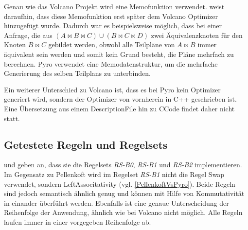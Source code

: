 Genau wie das Volcano Projekt wird eine Memofunktion verwendet. \cite{roy2001multi} weist daraufhin, dass diese Memofunktion erst später dem Volcano Optimizer hinzugefügt wurde. Dadurch war es beispielsweise möglich, dass bei einer Anfrage, die aus $(A \Join B \Join C) \cup (B \Join C \Join D)$ zwei Äquivalenzknoten für den Knoten $B \Join C$ gebildet werden, obwohl alle Teilpläne von $A \Join B$ immer äquivalent sein werden und somit kein Grund besteht, die Pläne mehrfach zu berechnen. Pyro verwendet eine Memodatenstruktur, um die mehrfache Generierung des selben Teilplans zu unterbinden.

Ein weiterer Unterschied zu Volcano ist, dass es  bei Pyro kein Optimizer generiert wird, sondern der Optimizer von vornherein in C++ geschrieben ist. Eine Übersetzung aus einem Description\-File hin zu C\-Code findet daher nicht statt.

\subsection{Getestete Regeln und Regelsets}

\cite{shanbhag2014optimizing} und \cite{roy2001multi} geben an, dass sie die Regelsets \textit{RS-B0}, \textit{RS-B1} und \textit{RS-B2} implementieren. Im Gegensatz zu Pellenkoft wird im Regelset \textit{RS-B1} nicht die Regel Swap verwendet, sondern Left\-Associtativity (vgl. \ref{PellenkoftVsPyro}). Beide Regeln sind jedoch semantisch ähnlich genug und können mit Hilfe von Kommutativität in einander überführt werden. Ebenfalls ist eine genaue Unterscheidung der Reihenfolge der Anwendung, ähnlich wie bei Volcano nicht möglich. Alle Regeln laufen immer in einer vorgegeben Reihenfolge ab.

